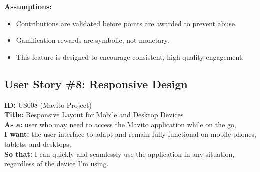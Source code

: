 \documentclass[12pt]{article}
\begin{document}
\vspace{1em}
\textbf{Assumptions:}
\begin{itemize}
    \item Contributions are validated before points are awarded to prevent abuse.
    \item Gamification rewards are symbolic, not monetary.
    \item This feature is designed to encourage consistent, high-quality engagement.
\end{itemize}


\subsection{User Story \#8: Responsive Design}
\textbf{ID:} US008 (Mavito Project) \\
\textbf{Title:} Responsive Layout for Mobile and Desktop Devices \\
\textbf{As a:} user who may need to access the Mavito application while on the go, \\
\textbf{I want:} the user interface to adapt and remain fully functional on mobile phones, tablets, and desktops, \\
\textbf{So that:} I can quickly and seamlessly use the application in any situation, regardless of the device I'm using.
\end{document}
